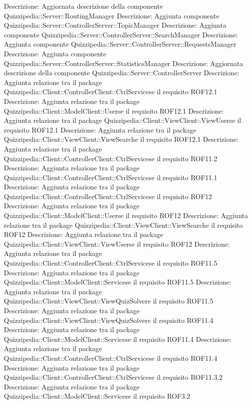Descrizione: Aggiornata descrizione della componente Quizzipedia::Server::RoutingManager 
Descrizione: Aggiunta componente Quizzipedia::Server::ControllerServer::TopicManager 
Descrizione: Aggiunta componente Quizzipedia::Server::ControllerServer::SearchManager 
Descrizione: Aggiunta componente Quizzipedia::Server::ControllerServer::RequestsManager 
Descrizione: Aggiunta componente Quizzipedia::Server::ControllerServer::StatisticsManager 
Descrizione: Aggiornata descrizione della componente Quizzipedia::Server::ControllerServer 
Descrizione: Aggiunta relazione tra il package Quizzipedia::Client::ControllerClient::CtrlServicese il requisito ROF12.1 
Descrizione: Aggiunta relazione tra il package Quizzipedia::Client::ModelClient::Userse il requisito ROF12.1 
Descrizione: Aggiunta relazione tra il package Quizzipedia::Client::ViewClient::ViewUserse il requisito ROF12.1 
Descrizione: Aggiunta relazione tra il package Quizzipedia::Client::ViewClient::ViewSearche il requisito ROF12.1 
Descrizione: Aggiunta relazione tra il package Quizzipedia::Client::ControllerClient::CtrlServicese il requisito ROF11.2 
Descrizione: Aggiunta relazione tra il package Quizzipedia::Client::ControllerClient::CtrlServicese il requisito ROF11.1 
Descrizione: Aggiunta relazione tra il package Quizzipedia::Client::ControllerClient::CtrlServicese il requisito ROF12 
Descrizione: Aggiunta relazione tra il package Quizzipedia::Client::ModelClient::Userse il requisito ROF12 
Descrizione: Aggiunta relazione tra il package Quizzipedia::Client::ViewClient::ViewSearche il requisito ROF12 
Descrizione: Aggiunta relazione tra il package Quizzipedia::Client::ViewClient::ViewUserse il requisito ROF12 
Descrizione: Aggiunta relazione tra il package Quizzipedia::Client::ControllerClient::CtrlServicese il requisito ROF11.5 
Descrizione: Aggiunta relazione tra il package Quizzipedia::Client::ModelClient::Servicese il requisito ROF11.5 
Descrizione: Aggiunta relazione tra il package Quizzipedia::Client::ViewClient::ViewQuizSolvere il requisito ROF11.5 
Descrizione: Aggiunta relazione tra il package Quizzipedia::Client::ViewClient::ViewQuizSolvere il requisito ROF11.4 
Descrizione: Aggiunta relazione tra il package Quizzipedia::Client::ModelClient::Servicese il requisito ROF11.4 
Descrizione: Aggiunta relazione tra il package Quizzipedia::Client::ControllerClient::CtrlServicese il requisito ROF11.4 
Descrizione: Aggiunta relazione tra il package Quizzipedia::Client::ControllerClient::CtrlServicese il requisito ROF11.3.2 
Descrizione: Aggiunta relazione tra il package Quizzipedia::Client::ModelClient::Servicese il requisito ROF3.2 
